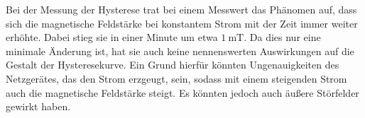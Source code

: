 Bei der Messung der Hysterese trat bei einem Messwert das Phänomen auf, dass sich
die magnetische Feldstärke bei konstantem Strom mit der Zeit immer weiter erhöhte.
Dabei stieg sie in einer Minute um etwa $\SI{1}{\milli\tesla}$. Da dies nur eine minimale Änderung
ist, hat sie auch keine nennenswerten Auswirkungen auf die Gestalt der Hysteresekurve.
Ein Grund hierfür könnten Ungenauigkeiten des Netzgerätes, das den Strom erzgeugt, sein,
sodass mit einem steigenden Strom auch die magnetische Feldstärke steigt. Es
könnten jedoch auch äußere Störfelder gewirkt haben.
